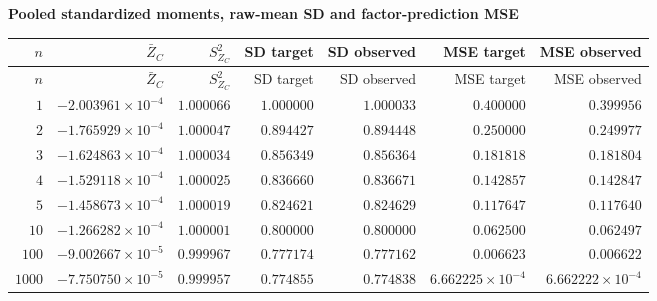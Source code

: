 
\begingroup\small
\setlength{\tabcolsep}{4pt}
\noindent\textbf{Pooled standardized moments, raw-mean SD and factor-prediction MSE}
\begin{longtable}{rrrrrrr}
\toprule
$n$ & $\bar Z_C$ & $S^2_{Z_C}$ & SD target & SD observed & MSE target & MSE observed \\
\midrule
\endfirsthead
$n$ & $\bar Z_C$ & $S^2_{Z_C}$ & SD target & SD observed & MSE target & MSE observed \\
\midrule
\endhead
\bottomrule
\endfoot
$1$ & $-2.003961\times10^{-4}$ & $1.000066$ & $1.000000$ & $1.000033$ & $0.400000$ & $0.399956$ \\
$2$ & $-1.765929\times10^{-4}$ & $1.000047$ & $0.894427$ & $0.894448$ & $0.250000$ & $0.249977$ \\
$3$ & $-1.624863\times10^{-4}$ & $1.000034$ & $0.856349$ & $0.856364$ & $0.181818$ & $0.181804$ \\
$4$ & $-1.529118\times10^{-4}$ & $1.000025$ & $0.836660$ & $0.836671$ & $0.142857$ & $0.142847$ \\
$5$ & $-1.458673\times10^{-4}$ & $1.000019$ & $0.824621$ & $0.824629$ & $0.117647$ & $0.117640$ \\
$10$ & $-1.266282\times10^{-4}$ & $1.000001$ & $0.800000$ & $0.800000$ & $0.062500$ & $0.062497$ \\
$100$ & $-9.002667\times10^{-5}$ & $0.999967$ & $0.777174$ & $0.777162$ & $0.006623$ & $0.006622$ \\
$1000$ & $-7.750750\times10^{-5}$ & $0.999957$ & $0.774855$ & $0.774838$ & $6.662225\times10^{-4}$ & $6.662222\times10^{-4}$ \\
\end{longtable}
\endgroup
